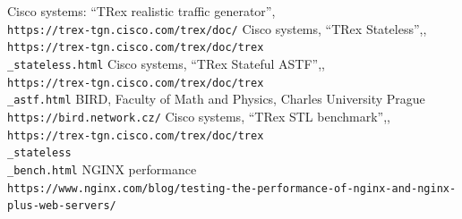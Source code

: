 \documentclass[conference]{IEEEtran}
\begin{document}
\begin{thebibliography}{00}
 Cisco systems: ``TRex realistic traffic generator'',\\\texttt{https://trex-tgn.cisco.com/trex/doc/}
 Cisco systems, ``TRex Stateless'',,\\\texttt{https://trex-tgn.cisco.com/trex/doc/trex\\\_stateless.html}
 Cisco systems, ``TRex Stateful ASTF'',,\\\texttt{https://trex-tgn.cisco.com/trex/doc/trex\\\_astf.html}
 BIRD, Faculty of Math and Physics, Charles University Prague \\\texttt{https://bird.network.cz/}
 Cisco systems, ``TRex STL benchmark'',,\\\texttt{https://trex-tgn.cisco.com/trex/doc/trex\\\_stateless\\\_bench.html}
 NGINX performance  \\\texttt{https://www.nginx.com/blog/testing-the-performance-of-nginx-and-nginx-plus-web-servers/}
\end{thebibliography}
\end{document}
